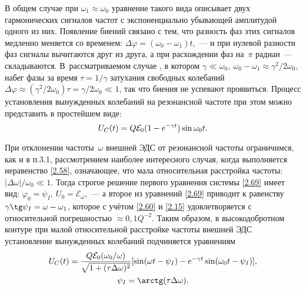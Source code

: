 \documentclass[a4paper,oneside]{book}
\begin{document}
В общем случае при $\omega_1\approx\omega_0$ уравнение такого вида описывает
 двух гармонических сигналов  частот с
экспоненциально убывающей амплитудой одного из них. Появление биений связано с
тем, что разность фаз этих сигналов медленно меняется со временем:
$\Delta\varphi=(\omega_0-\omega_1)t$,~--- и при нулевой разности фаз сигналы
вычитаются друг из друга, а при расхождении фаз на~$\pi$
радиан~--- складываются. В~рассматриваемом случае , в котором
$\gamma\ll\omega_0,~\omega_0-\omega_1\approx\gamma^2/2\omega_0$, набег фазы за
время $\tau=1/\gamma$ затухания свободных колебаний
$\Delta\varphi\approx(\gamma^2/2\omega_0)\tau=\gamma/2\omega_0\ll1$,  так что
биения не успевают проявиться. Процесс установления вынужденных колебаний на
резонансной частоте при этом можно представить в простейшем виде:
\begin{equation}\eqmark{2.71}
	U_C(t)=Q\mathcal{E}_0(1-e^{-\gamma t})\sin\omega_0 t.
\end{equation}

При отклонении частоты~$\omega$ внешней ЭДС от резонансной частоты
ограничимся, как и в п.3.1, рассмотрением наиболее интересного случая, когда
выполняется неравенство \eqref{2.58}, означающее, что мала относительная
расстройка частоты: $|\Delta\omega|/\omega_0\ll 1$. Тогда строгое решение первого
уравнения системы \eqref{2.69} имеет вид:
$\varphi_0=\psi_I,~U_0=\mathcal{E}_{\omega}$,~--- а второе из уравнений
\eqref{2.69} приводит к равенству $\gamma\tg\psi_I=\omega-\omega_1$, которое с
учётом \eqref{2.60} и \eqref{2.15} удовлетворяется с относительной погрешностью
$\approx0,1Q^{-2}$. Таким образом, в высокодобротном контуре при малой
относительной расстройке частоты внешней ЭДС установление вынужденных колебаний
подчиняется уравнениям
\begin{equation}
	\eqmark{2.72}
	\begin{gathered}[c]
U_C(t)=\dfrac{Q\mathcal{E}_0(\omega_0/\omega)}{\sqrt{1+(\tau\Delta\omega)^2}}[
\sin(\omega t-\psi_I)-e^{-\gamma t}\sin(\omega_0t-\psi_I)],\\
		\psi_I=\arctg(\tau\Delta\omega).
	\end{gathered}
\end{equation}
\end{document}
